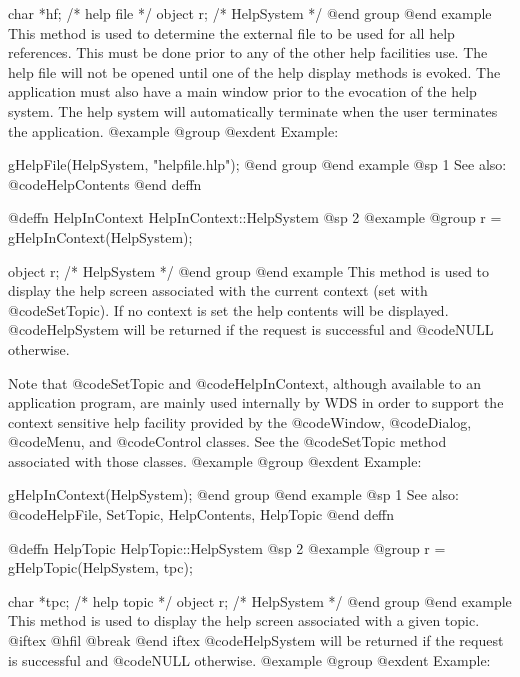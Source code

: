 char    *hf;    /*  help file   */
object  r;      /*  HelpSystem  */
@end group
@end example
This method is used to determine the external file to be used for all help
references.  This must be done prior to any of the other help facilities
use.  The help file will not be opened until one of the help display
methods is evoked.  The application must also have a main window prior
to the evocation of the help system.  The help system will automatically
terminate when the user terminates the application.
@example
@group
@exdent Example:

gHelpFile(HelpSystem, "helpfile.hlp");
@end group
@end example
@sp 1
See also:  @code{HelpContents}
@end deffn














@deffn {HelpInContext} HelpInContext::HelpSystem
@sp 2
@example
@group
r = gHelpInContext(HelpSystem);

object  r;      /*  HelpSystem  */
@end group
@end example
This method is used to display the help screen associated with the
current context (set with @code{SetTopic}).  If no context is set the
help contents will be displayed.  @code{HelpSystem} will be returned if
the request is successful and @code{NULL} otherwise.

Note that @code{SetTopic} and @code{HelpInContext}, although available
to an application program, are mainly used internally by WDS in order to
support the context sensitive help facility provided by the @code{Window},
@code{Dialog}, @code{Menu}, and @code{Control} classes.  See the
@code{SetTopic} method associated with those classes.
@example
@group
@exdent Example:

gHelpInContext(HelpSystem);
@end group
@end example
@sp 1
See also:  @code{HelpFile, SetTopic, HelpContents, HelpTopic}
@end deffn







@deffn {HelpTopic} HelpTopic::HelpSystem
@sp 2
@example
@group
r = gHelpTopic(HelpSystem, tpc);

char    *tpc;   /*  help topic  */
object  r;      /*  HelpSystem  */
@end group
@end example
This method is used to display the help screen associated with a given topic.
@iftex
@hfil @break 
@end iftex
@code{HelpSystem} will be returned if the request is successful
and @code{NULL} otherwise.
@example
@group
@exdent Example:

